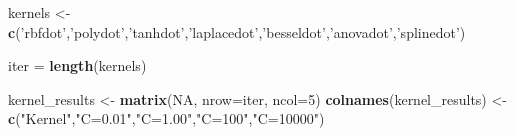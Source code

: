 \documentclass[
]{article}
\newenvironment{Shaded}{\begin{snugshade}}{\end{snugshade}}
\newcommand{\DataTypeTok}[1]{\textcolor[rgb]{0.13,0.29,0.53}{#1}}
\newcommand{\DecValTok}[1]{\textcolor[rgb]{0.00,0.00,0.81}{#1}}
\newcommand{\KeywordTok}[1]{\textcolor[rgb]{0.13,0.29,0.53}{\textbf{#1}}}
\newcommand{\NormalTok}[1]{#1}
\newcommand{\OtherTok}[1]{\textcolor[rgb]{0.56,0.35,0.01}{#1}}
\newcommand{\StringTok}[1]{\textcolor[rgb]{0.31,0.60,0.02}{#1}}
\begin{document}
\begin{Shaded}
\begin{Highlighting}[]
\NormalTok{kernels <-}\StringTok{ }\KeywordTok{c}\NormalTok{(}\StringTok{'rbfdot'}\NormalTok{,}\StringTok{'polydot'}\NormalTok{,}\StringTok{'tanhdot'}\NormalTok{,}\StringTok{'laplacedot'}\NormalTok{,}\StringTok{'besseldot'}\NormalTok{,}\StringTok{'anovadot'}\NormalTok{,}\StringTok{'splinedot'}\NormalTok{) }

\NormalTok{iter =}\StringTok{ }\KeywordTok{length}\NormalTok{(kernels)}


\NormalTok{kernel_results <-}\StringTok{ }\KeywordTok{matrix}\NormalTok{(}\OtherTok{NA}\NormalTok{, }\DataTypeTok{nrow=}\NormalTok{iter, }\DataTypeTok{ncol=}\DecValTok{5}\NormalTok{)}
\KeywordTok{colnames}\NormalTok{(kernel_results) <-}\StringTok{ }\KeywordTok{c}\NormalTok{(}\StringTok{"Kernel"}\NormalTok{,}\StringTok{"C=0.01"}\NormalTok{,}\StringTok{"C=1.00"}\NormalTok{,}\StringTok{"C=100"}\NormalTok{,}\StringTok{"C=10000"}\NormalTok{)}


\end{Highlighting}
\end{Shaded}
\end{document}
